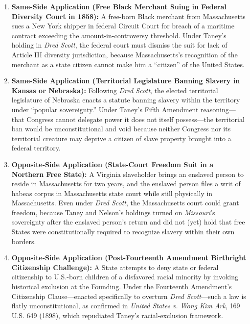 \documentclass[12pt]{article}
\begin{document}
\begin{enumerate}
  \item \textbf{Same-Side Application (Free Black Merchant Suing in Federal Diversity Court in 1858):} A free-born Black merchant from Massachusetts sues a New York shipper in federal Circuit Court for breach of a maritime contract exceeding the amount-in-controversy threshold. Under Taney's holding in \textit{Dred Scott}, the federal court must dismiss the suit for lack of Article III diversity jurisdiction, because Massachusetts's recognition of the merchant as a state citizen cannot make him a ``citizen'' of the United States.
  \item \textbf{Same-Side Application (Territorial Legislature Banning Slavery in Kansas or Nebraska):} Following \textit{Dred Scott}, the elected territorial legislature of Nebraska enacts a statute banning slavery within the territory under ``popular sovereignty.'' Under Taney's Fifth Amendment reasoning---that Congress cannot delegate power it does not itself possess---the territorial ban would be unconstitutional and void because neither Congress nor its territorial creature may deprive a citizen of slave property brought into a federal territory.
  \item \textbf{Opposite-Side Application (State-Court Freedom Suit in a Northern Free State):} A Virginia slaveholder brings an enslaved person to reside in Massachusetts for two years, and the enslaved person files a writ of habeas corpus in Massachusetts state court while still physically in Massachusetts. Even under \textit{Dred Scott}, the Massachusetts court could grant freedom, because Taney and Nelson's holdings turned on \textit{Missouri}'s sovereignty after the enslaved person's return and did not (yet) hold that free States were constitutionally required to recognize slavery within their own borders.
  \item \textbf{Opposite-Side Application (Post-Fourteenth Amendment Birthright Citizenship Challenge):} A State attempts to deny state or federal citizenship to U.S.-born children of a disfavored racial minority by invoking historical exclusion at the Founding. Under the Fourteenth Amendment's Citizenship Clause---enacted specifically to overturn \textit{Dred Scott}---such a law is flatly unconstitutional, as confirmed in \textit{United States v. Wong Kim Ark}, 169 U.S. 649 (1898), which repudiated Taney's racial-exclusion framework.

\end{enumerate}
\end{document}
